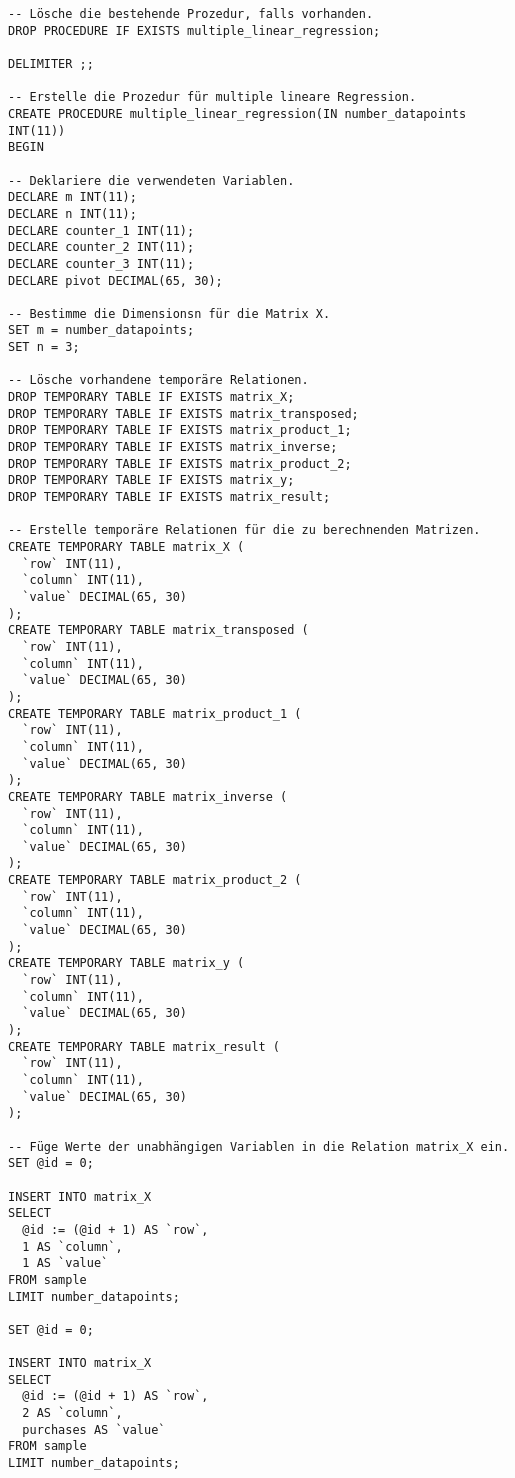 \begin{verbatim}
-- Lösche die bestehende Prozedur, falls vorhanden.
DROP PROCEDURE IF EXISTS multiple_linear_regression;

DELIMITER ;;

-- Erstelle die Prozedur für multiple lineare Regression.
CREATE PROCEDURE multiple_linear_regression(IN number_datapoints INT(11))
BEGIN

-- Deklariere die verwendeten Variablen.
DECLARE m INT(11);
DECLARE n INT(11);
DECLARE counter_1 INT(11);
DECLARE counter_2 INT(11);
DECLARE counter_3 INT(11);
DECLARE pivot DECIMAL(65, 30);

-- Bestimme die Dimensionsn für die Matrix X.
SET m = number_datapoints;
SET n = 3;

-- Lösche vorhandene temporäre Relationen.
DROP TEMPORARY TABLE IF EXISTS matrix_X;
DROP TEMPORARY TABLE IF EXISTS matrix_transposed;
DROP TEMPORARY TABLE IF EXISTS matrix_product_1;
DROP TEMPORARY TABLE IF EXISTS matrix_inverse;
DROP TEMPORARY TABLE IF EXISTS matrix_product_2;
DROP TEMPORARY TABLE IF EXISTS matrix_y;
DROP TEMPORARY TABLE IF EXISTS matrix_result;

-- Erstelle temporäre Relationen für die zu berechnenden Matrizen.
CREATE TEMPORARY TABLE matrix_X (
  `row` INT(11),
  `column` INT(11),
  `value` DECIMAL(65, 30)
);
CREATE TEMPORARY TABLE matrix_transposed (
  `row` INT(11),
  `column` INT(11),
  `value` DECIMAL(65, 30)
);
CREATE TEMPORARY TABLE matrix_product_1 (
  `row` INT(11),
  `column` INT(11),
  `value` DECIMAL(65, 30)
);
CREATE TEMPORARY TABLE matrix_inverse (
  `row` INT(11),
  `column` INT(11),
  `value` DECIMAL(65, 30)
);
CREATE TEMPORARY TABLE matrix_product_2 (
  `row` INT(11),
  `column` INT(11),
  `value` DECIMAL(65, 30)
);
CREATE TEMPORARY TABLE matrix_y (
  `row` INT(11),
  `column` INT(11),
  `value` DECIMAL(65, 30)
);
CREATE TEMPORARY TABLE matrix_result (
  `row` INT(11),
  `column` INT(11),
  `value` DECIMAL(65, 30)
);

-- Füge Werte der unabhängigen Variablen in die Relation matrix_X ein.
SET @id = 0;

INSERT INTO matrix_X
SELECT
  @id := (@id + 1) AS `row`,
  1 AS `column`,
  1 AS `value`
FROM sample
LIMIT number_datapoints;

SET @id = 0;

INSERT INTO matrix_X
SELECT
  @id := (@id + 1) AS `row`,
  2 AS `column`,
  purchases AS `value`
FROM sample
LIMIT number_datapoints;


\end{verbatim}
